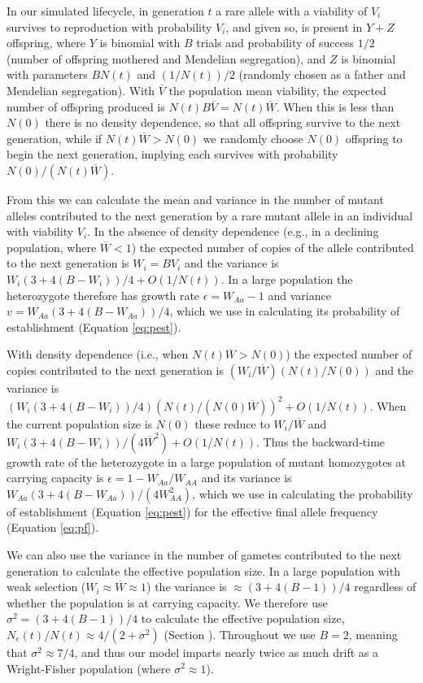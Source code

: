 \documentclass[]{article}
\begin{document}
In our simulated lifecycle, in generation $t$ a rare allele with a viability of $V_i$ survives to reproduction with probability $V_i$, and given so, is present in $Y+Z$ offspring, where $Y$ is binomial with $B$ trials and probability of success $1/2$ (number of offspring mothered and Mendelian segregation), and $Z$ is binomial with parameters $B N(t)$ and $(1/N(t))/2$ (randomly chosen as a father and Mendelian segregation).
With $\overline{V}$ the population mean viability, the expected number of offspring produced is $N(t) B \overline{V} = N(t) \overline{W}$.
When this is less than $N(0)$ there is no density dependence, so that all offspring survive to the next generation, while if $N(t) \overline{W} > N(0)$ we randomly choose $N(0)$ offspring to begin the next generation, implying each survives with probability $N(0)/(N(t)\overline{W})$.

From this we can calculate the mean and variance in the number of mutant alleles contributed to the next generation by a rare mutant allele in an individual with viability $V_i$.
In the absence of density dependence (e.g., in a declining population, where $\overline{W} < 1$) the expected number of copies of the allele contributed to the next generation is $W_i = B V_i$ and the variance is $W_i(3+4(B-W_i))/4 + O(1/N(t))$.
In a large population the heterozygote therefore has growth rate $\epsilon = W_{Aa} - 1$ and variance $v = W_{Aa}(3+4(B-W_{Aa}))/4$, which we use in calculating its probability of establishment (Equation \ref{eq:pest}).

With density dependence (i.e., when $N(t)\overline{W}>N(0)$) the expected number of copies contributed to the next generation is $(W_i / \overline{W})(N(t) / N(0))$ and the variance is $(W_i(3+4(B-W_i))/4)(N(t)/(N(0)\overline{W}))^2 + O(1/N(t))$.
When the current population size is $N(0)$ these reduce to $W_i / \overline{W}$ and $W_i(3+4(B-W_i))/(4\overline{W}^2) + O(1/N(t))$.
Thus the backward-time growth rate of the heterozygote in a large population of mutant homozygotes at carrying capacity is $\epsilon = 1 - W_{Aa}/W_{AA}$ and its variance is $W_{Aa}(3+4(B-W_{Aa}))/(4W_{AA}^2)$, which we use in calculating the probability of establishment (Equation \ref{eq:pest}) for the effective final allele frequency (Equation \ref{eq:pf}).

We can also use the variance in the number of gametes contributed to the next generation to calculate the effective population size.
In a large population with weak selection ($W_i\approx\overline{W}\approx1$) the variance is $\approx (3+4(B-1))/4$ regardless of whether the population is at carrying capacity.
We therefore use $\sigma^2 = (3+4(B-1))/4$ to calculate the effective population size, $N_e(t)/N(t) \approx 4/(2+\sigma^2)$ (Section ).
Throughout we use $B=2$, meaning that $\sigma^2 \approx 7/4$, and thus our model imparts nearly twice as much drift as a Wright-Fisher population (where $\sigma^2\approx1$).
\end{document}
